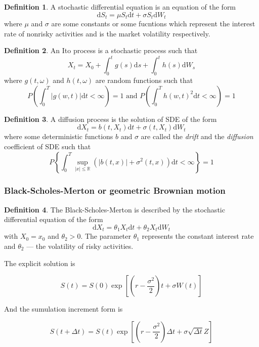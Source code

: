 \documentclass{article}
\theoremstyle{definition}
\newtheorem{definition}{Definition}[section]
\begin{document}
\begin{definition}
    A stochastic differential equation is an equation of the form
    $$\mathrm d S_t = \mu S_t \mathrm dt + \sigma S_t \mathrm d W_t$$
    where $\mu$ and $\sigma$ are some constants or some fucntions which represent the interest rate of nonrisky activities and is the market volatility respectively.
\end{definition}

\begin{definition}
    An Ito process is a stochastic process such that
    $$X_t = X_0 + \int_0^t g(s) \mathrm ds + \int_0^t h(s) \mathrm dW_s$$
    where $g(t, \omega)$ and $h(t, \omega)$ are random functions such that
    $$P \left( \int_0^T |g(w, t)| \mathrm dt  < \infty\right) = 1 \text{ and } P \left( \int_0^T h(w, t)^2 \mathrm dt  < \infty\right) = 1$$
\end{definition}

\begin{definition}
    A diffusion process is the solution of SDE of the form
    $$\mathrm d X_t = b(t, X_t) \mathrm  d t + \sigma(t, X_t) \mathrm d W_t$$
    where some deterministic functions $b$ and $\sigma$ are called the \emph{drift} and the \emph{diffusion} coefficient of SDE such that
    $$P\left\{\int_0^T \sup_{|x|\leq \mathbb R}(|b(t, x)| + \sigma^2(t, x))\mathrm dt < \infty\right\} = 1$$
\end{definition}

\subsubsection{Black-Scholes-Merton or geometric Brownian motion}

\begin{definition}
    The  Black-Scholes-Merton is described by the stochastic differential equation of the form
    $$\mathrm d X_t = \theta_1 X_t \mathrm d t + \theta_2 X_t \mathrm d W_t$$
    with $X_0=x_0$ and $\theta_2 > 0$. The parameter $\theta_1$ represents the constant interest rate and $\theta_2$ --- the volatility of risky activities.
\end{definition}

The explicit solution is 

$$S(t) = S(0) \exp\left[ \left(r - \frac{\sigma^2}{2} \right) t + \sigma W(t) \right]$$

And the sumulation increment form is

$$S(t+\Delta t) = S(t)\exp\left[ \left( r - \frac{\sigma^2}{2} \right) \Delta t + \sigma \sqrt{\Delta t} Z \right]$$
\end{document}
